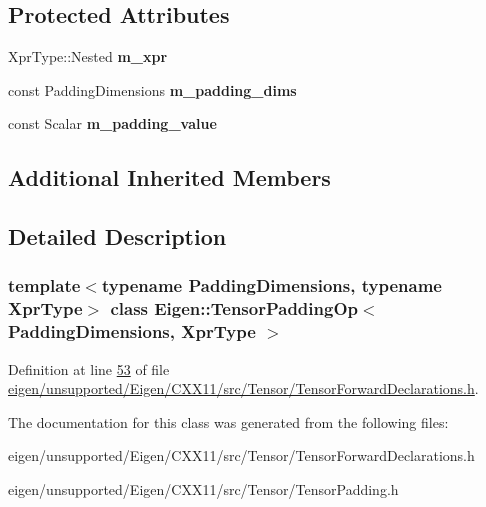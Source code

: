 \subsection*{Protected Attributes}
\begin{DoxyCompactItemize}
\item 
\mbox{\label{class_eigen_1_1_tensor_padding_op_a6f3b2c051708a3c9eeb2f8eee5fdea37}} 
Xpr\+Type\+::\+Nested {\bfseries m\+\_\+xpr}
\item 
\mbox{\label{class_eigen_1_1_tensor_padding_op_a667964bf156b7e1110d452990f55caa6}} 
const Padding\+Dimensions {\bfseries m\+\_\+padding\+\_\+dims}
\item 
\mbox{\label{class_eigen_1_1_tensor_padding_op_aa0f21f557674e3435a26a8ddacfe6e47}} 
const Scalar {\bfseries m\+\_\+padding\+\_\+value}
\end{DoxyCompactItemize}
\subsection*{Additional Inherited Members}


\subsection{Detailed Description}
\subsubsection*{template$<$typename Padding\+Dimensions, typename Xpr\+Type$>$\newline
class Eigen\+::\+Tensor\+Padding\+Op$<$ Padding\+Dimensions, Xpr\+Type $>$}



Definition at line \hyperlink{eigen_2unsupported_2_eigen_2_c_x_x11_2src_2_tensor_2_tensor_forward_declarations_8h_source_l00053}{53} of file \hyperlink{eigen_2unsupported_2_eigen_2_c_x_x11_2src_2_tensor_2_tensor_forward_declarations_8h_source}{eigen/unsupported/\+Eigen/\+C\+X\+X11/src/\+Tensor/\+Tensor\+Forward\+Declarations.\+h}.



The documentation for this class was generated from the following files\+:\begin{DoxyCompactItemize}
\item 
eigen/unsupported/\+Eigen/\+C\+X\+X11/src/\+Tensor/\+Tensor\+Forward\+Declarations.\+h\item 
eigen/unsupported/\+Eigen/\+C\+X\+X11/src/\+Tensor/\+Tensor\+Padding.\+h\end{DoxyCompactItemize}
